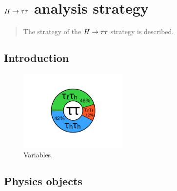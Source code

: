 \chapter[$\Htautau$ analysis strategy][$\Htautau$ analysis strategy]{$\Htautau$ analysis strategy}
\label{chap:strategy}

\begin{quote}
The strategy of the $\Htautau$ strategy is described.
\end{quote}

\section{Introduction}
\label{sec:strategy-introduction}

\begin{figure}[tp]
  \centering
  \includegraphics[width=0.48\textwidth]{figures/piecharts/tautaudecay}
  \caption{Variables.}
  \label{fig:strategy-decaypie}
\end{figure}

\section{Physics objects}
\label{sec:strategy-objects}

